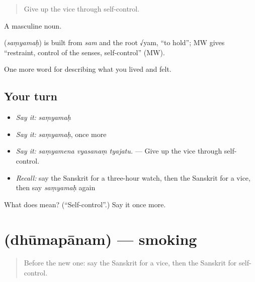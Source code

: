 \begin{quote}
Give up the vice through self-control.
\end{quote}

A masculine noun.

\begin{cousinweb}
\textbf{} (\emph{saṃyamaḥ}) is built from \emph{sam} and the root √yam, \textquotedblleft{}to hold\textquotedblright{}; MW gives \textquotedblleft{}restraint, control of the senses, self-control\textquotedblright{} (MW).
\end{cousinweb}

\begin{grammarlens}[title={What you've built}]
One more word for describing what you lived and felt.
\end{grammarlens}

\subsection*{Your turn}
\begin{itemize}
\raggedright
  \item \emph{Say it:} \emph{saṃyamaḥ}
  \item \emph{Say it:} \emph{saṃyamaḥ}, once more
  \item \emph{Say it:} \emph{saṃyamena vyasanaṃ tyajatu.} — Give up the vice through self-control.
  \item \emph{Recall:} say the Sanskrit for a three-hour watch, then the Sanskrit for a vice, then say \emph{saṃyamaḥ} again
\end{itemize}

\begin{tcolorbox}[breakable,colback=teal!4,colframe=teal!35!black,title={Before you move on}]
What does  mean? (\textquotedblleft{}Self-control\textquotedblright{}.) Say it once more.
\end{tcolorbox}
\section[\texorpdfstring{\sk{धूमपानम्} (dhūmapānam)}{धूमपानम् (dhūmapānam)}]{ (dhūmapānam) — smoking}

\label{lesson:SA-C489-dhumapanam}



\begin{quote}
Before the new one: say the Sanskrit for a vice, then the Sanskrit for self-control.
\end{quote}

